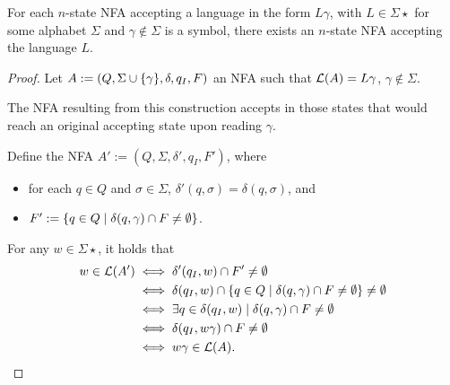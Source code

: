 \begin{thrm}
	For each $n$-state NFA accepting a language in the form $L\gamma$, with $L\in\Sigma\star$ for some alphabet $\Sigma$ and $\gamma\notin\Sigma$ is a symbol, there exists an $n$-state NFA accepting the language $L$.
\end{thrm}
\begin{proof}
	Let $A:=(Q,\Sigma\cup\{\gamma\},\delta,q_I,F)$ an NFA such that $\mathcal L(A)=L\gamma$, $\gamma\notin\Sigma$.

	The NFA resulting from this construction accepts in those states that would reach an original accepting state upon reading $\gamma$.

	Define the NFA $A':=(Q,\Sigma,\delta',q_I,F')$, where
	\begin{itemize}
		\item for each $q\in Q$ and $\sigma\in\Sigma$, $\delta'(q,\sigma)=\delta(q,\sigma)$, and
		\item $F':=\{q\in Q\mid \delta(q,\gamma)\cap F\ne\emptyset\}$.
	\end{itemize}

	For any $w\in\Sigma\star$, it holds that
	\begin{align*}
		w\in\mathcal L(A') & \iff \delta'(q_I,w)\cap F'\ne\emptyset                                                 \\
		                 & \iff \delta(q_I,w)\cap \{q\in Q\mid \delta(q,\gamma)\cap F\ne\emptyset\}\ne\emptyset \\
		                 & \iff \exists q\in\delta(q_I,w)\mid \delta(q,\gamma)\cap F\ne\emptyset                  \\
		                 & \iff \delta(q_I,w\gamma)\cap F\ne\emptyset                                             \\
		                 & \iff w\gamma\in\mathcal L(A) \text. \qedhere
	\end{align*}
\end{proof}
